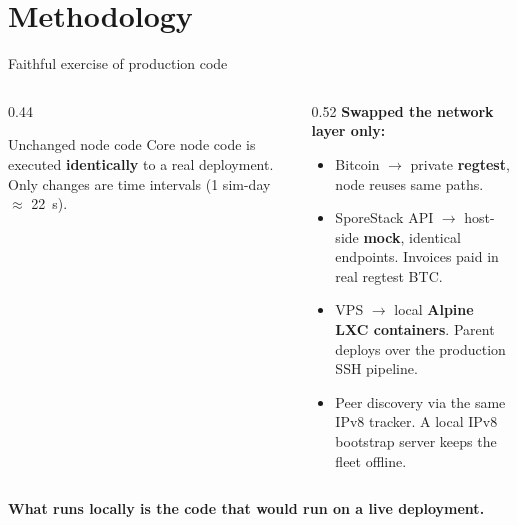 
{
  \renewcommand{\sectionsubtitle}{Testing the node code offline and without cost}
  \section{Methodology}
}


{
\begin{frame}{Faithful exercise of production code}
  \small
  \begin{columns}[T, onlytextwidth]
    \begin{column}{0.44\textwidth}
      \begin{block}{Unchanged node code}
        Core node code is executed \textbf{identically} to a real deployment. Only changes are time intervals (1 sim-day \(\approx\) \qty{22}{s}).
      \end{block}
    \end{column}
    \begin{column}{0.52\textwidth}
    \smallskip
    \smallskip
      \textbf{Swapped the network layer only:}
      \begin{itemize}
        \item Bitcoin \(\to\) private \textbf{regtest}, node reuses same paths.
        \item SporeStack API \(\to\) host-side \textbf{mock}, identical endpoints.
          Invoices paid in real regtest BTC.
        \item VPS \(\to\) local \textbf{Alpine LXC containers}. Parent deploys over the production SSH pipeline.
        \item Peer discovery via the same IPv8 tracker. A local IPv8 bootstrap server keeps the fleet offline.
      \end{itemize}
    \end{column}
  \end{columns}
  \smallskip
  \smallskip
  \smallskip
  \smallskip
  \textcolor{tud Orange}{\textbf{What runs locally is the code that would run on a live deployment.}}
\end{frame}
}


